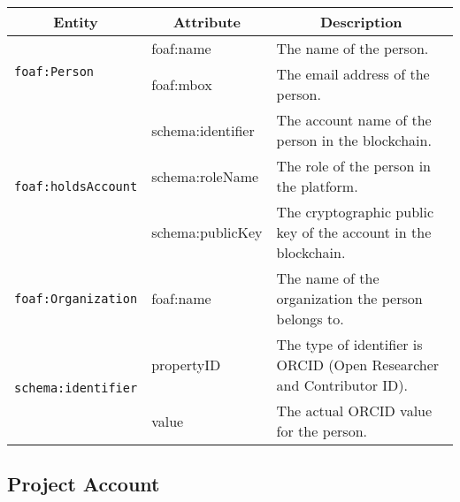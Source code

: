 \documentclass{article}
\begin{document}
\begin{longtable}{|l|l|p{8cm}|}
    \hline
    \multicolumn{1}{|c|}{\textbf{Entity}}   &
    \multicolumn{1}{c|}{\textbf{Attribute}} &
    \multicolumn{1}{c|}{\textbf{Description}}                                                                                           \\
    \hline
    \multirow{2}{*}{\texttt{foaf:Person}}
                                            & foaf:name         & The name of the person.                                               \\ \cline{2-3}
                                            & foaf:mbox         & The email address of the person.                                      \\ \cline{2-3}
    \hline
    \multirow{3}{*}{\texttt{foaf:holdsAccount}}
                                            & schema:identifier & The account name of the person in the blockchain.                     \\ \cline{2-3}
                                            & schema:roleName   & The role of the person in the platform.                               \\ \cline{2-3}
                                            & schema:publicKey  & The cryptographic public key of the account in the blockchain.        \\
    \hline
    \multirow{1}{*}{\texttt{foaf:Organization}}
                                            & foaf:name         & The name of the organization the person belongs to.                   \\ \cline{1-3}

    \hline
    \multirow{2}{*}{\texttt{schema:identifier}}
                                            & propertyID        & The type of identifier is ORCID (Open Researcher and Contributor ID). \\ \cline{2-3}
                                            & value             & The actual ORCID value for the person.                                \\
    \hline
\end{longtable}

\subsection{Project Account}
\end{document}
